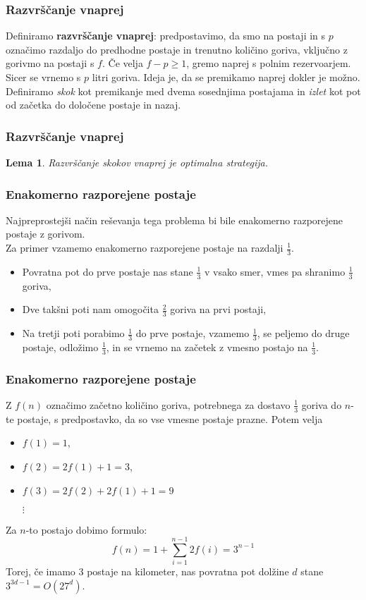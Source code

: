 \documentclass{beamer}
\newtheorem{lema}{Lema}
\begin{document}
 \begin{frame}
    \frametitle{Razvrščanje vnaprej}
    Definiramo \textbf{razvrščanje vnaprej}: predpostavimo, da smo na postaji in s $p$ 
    označimo razdaljo do predhodne postaje in trenutno količino goriva, vključno z gorivmo na postaji s $f$. Če velja 
    $f - p \geq 1$, gremo naprej s polnim rezervoarjem. Sicer se vrnemo s $p$ litri goriva. Ideja je, da se
    premikamo naprej dokler je možno. Definiramo \textit{skok} kot premikanje med dvema sosednjima postajama in
    \textit{izlet} kot pot od začetka do določene postaje in nazaj.
\end{frame}

\begin{frame}
    \frametitle{Razvrščanje vnaprej}
    \begin{lema}
        Razvrščanje skokov vnaprej je optimalna strategija.
    \end{lema}
\end{frame}

 \begin{frame}
    \frametitle{Enakomerno razporejene postaje}
    Najpreprostejši način reševanja tega problema bi bile enakomerno razporejene postaje z gorivom.  \\
    Za primer vzamemo enakomerno razporejene postaje na razdalji $\frac{1}{3}$.
    \begin{itemize}
        \item Povratna pot do prve postaje nas stane $\frac{1}{3}$ v vsako smer, vmes pa shranimo $\frac{1}{3}$ goriva,
        \item Dve takšni poti nam omogočita $\frac{2}{3}$ goriva na prvi postaji,
        \item Na tretji poti porabimo $\frac{1}{3}$ do prve postaje, vzamemo $\frac{1}{3}$, se peljemo do 
                druge postaje, odložimo $\frac{1}{3}$, in se vrnemo na začetek z vmesno postajo na $\frac{1}{3}$.
    \end{itemize}
\end{frame}


 \begin{frame}
    \frametitle{Enakomerno razporejene postaje}
    Z $f(n)$ označimo začetno količino goriva, potrebnega za dostavo $\frac{1}{3}$ goriva do $n$-te 
    postaje, s predpostavko, da so vse vmesne postaje prazne. Potem velja
    \begin{itemize}
        \item $f(1) = 1$,
        \item $f(2) = 2 f(1) + 1 = 3$,
        \item $f(3) = 2 f(2) + 2 f(1) + 1 = 9$
        \item[{$\vdots$}]
    \end{itemize}
    Za $n$-to postajo dobimo formulo:
        $$f(n) = 1 + \sum_{i=1}^{n-1} 2f(i) = 3^{n-1}$$
    Torej, če imamo $3$ postaje na kilometer, nas povratna pot dolžine $d$ stane $3^{3d-1} = O(27^d)$.
\end{frame}
\end{document}
